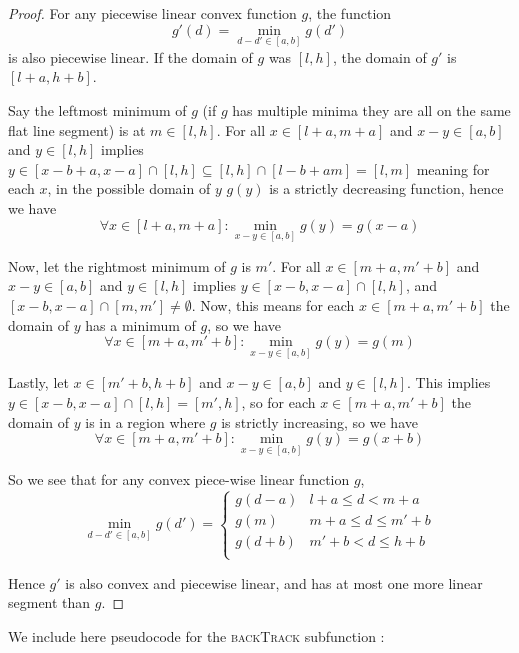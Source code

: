 \documentclass[conference]{IEEEtran}
\newcounter{cases}
\begin{document}
	\begin{proof}
		For any piecewise linear convex function $g$, the function $$g'(d) = \min_{d-d' \in [a,b]} g(d')$$ is also piecewise linear. 
		If the domain of $g$ was $[l, h]$, the domain of $g'$ is $[l + a, h + b]$. 
		
		Say the leftmost minimum of $g$ (if $g$ has multiple minima they are all on the same flat line segment) is at $m \in [l,h]$. 
		For all $x \in [l + a, m+ a] $ and $x - y \in [a, b]$ and $y \in [l,h]$ implies $y \in [x-b+a, x-a] \cap [l, h] \subseteq [l, h] \cap [l-b+a m] = [l,m]$ meaning for each $x$, in the possible domain of $y$ $g(y)$ is a strictly decreasing function, hence  we have $$\forall x \in [l + a, m+ a] : \min_{x - y \in [a,b]} g(y) = g(x - a) $$
		
		Now, let the rightmost minimum of $g$ is $m'$. 
		For all $x \in [m + a, m' + b] $ and $x - y \in [a, b]$ and $y \in [l,h]$ implies $y \in [x-b, x-a] \cap [l, h]$, and $[x - b, x - a] \cap [m, m'] \neq \emptyset$. 
		Now, this means for each $x \in [m+a, m' + b]$ the domain of $y$ has a minimum of $g$, so we have $$\forall x \in [m + a, m'+ b] : \min_{x - y \in [a,b]} g(y) = g(m) $$
		
		Lastly, let  $x \in [m' + b, h + b] $ and $x - y \in [a, b]$ and $y \in [l,h]$. 
		This implies $y \in [x-b, x-a] \cap [l, h] = [m', h]$, so for each $x \in [m+a, m' + b]$ the domain of $y$ is in a region where $g$ is strictly increasing, so we have $$\forall x \in [m + a, m'+ b] : \min_{x - y \in [a,b]} g(y) = g(x+b) $$
		
		So we see that for any convex piece-wise linear function $g$, $$\min_{d-d' \in [a,b]} g(d') = \begin{cases}
			g(d-a) & l + a \leq d < m + a \\
			g(m) & m+a \leq d \leq m' + b \\
			g(d+b) & m' + b < d \leq h + b   \\
		\end{cases}$$
		
		Hence $g'$ is also convex and piecewise linear, and has at most one more linear segment than $g$. 
	\end{proof}
	
	We include here pseudocode for the \textsc{backTrack} subfunction : 
	
\end{document}
